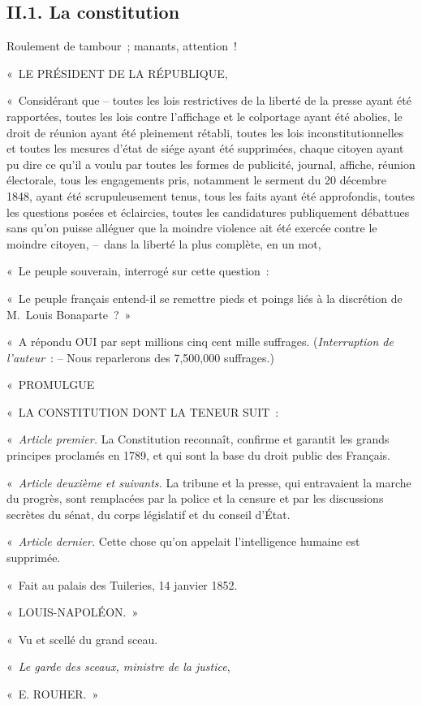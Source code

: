 \documentclass[french,twoside]{book} %
\newenvironment{quoteblock}%
  {\begin{quoting}}
  {\end{quoting}}
\newenvironment{quotebar}{%
    \def\FrameCommand{{\color{rubric!10!}\vrule width 0.5em} \hspace{0.9em}}%
    \def\OuterFrameSep{\itemsep} %
    \MakeFramed {\advance\hsize-\width \FrameRestore}
  }%
  {%
    \endMakeFramed
  }
\renewenvironment{quoteblock}%
  {%
    \savenotes
    \setstretch{0.9}
    \normalfont
    \begin{quotebar}
  }
  {%
    \end{quotebar}
    \spewnotes
  }
\begin{document}
\subsection[{II.1. La constitution}]{II.1. La constitution}
\noindent Roulement de tambour ; manants, attention !\par

\begin{quoteblock}
 \noindent « LE PRÉSIDENT DE LA RÉPUBLIQUE,\par
 « Considérant que – toutes les lois restrictives de la liberté de la presse ayant été rapportées, toutes les lois contre l’affichage et le colportage ayant été abolies, le droit de réunion ayant été pleinement rétabli, toutes les lois inconstitutionnelles et toutes les mesures d’état de siége ayant été supprimées, chaque citoyen ayant pu dire ce qu’il a voulu par toutes les formes de publicité, journal, affiche, réunion électorale, tous les engagements pris, notamment le serment du 20 décembre 1848, ayant été scrupuleusement tenus, tous les faits ayant été approfondis, toutes les questions posées et éclaircies, toutes les candidatures publiquement débattues sans qu’on puisse alléguer que la moindre violence ait été exercée contre le moindre citoyen, – dans la liberté la plus complète, en un mot,\par
 « Le peuple souverain, interrogé sur cette question :\par
 « Le peuple français entend-il se remettre pieds et poings liés à la discrétion de M. Louis Bonaparte ? »\par
 « A répondu OUI par sept millions cinq cent mille suffrages. (\emph{Interruption de l’auteur} : – Nous reparlerons des 7,500,000 suffrages.)\par
 « PROMULGUE\par
 « LA CONSTITUTION DONT LA TENEUR SUIT :\par
 « \emph{Article premier.} La Constitution reconnaît, confirme et garantit les grands principes proclamés en 1789, et qui sont la base du droit public des Français.\par
 « \emph{Article deuxième et suivants.} La tribune et la presse, qui entravaient la marche du progrès, sont remplacées par la police et la censure et par les discussions secrètes du sénat, du corps législatif et du conseil d’État.\par
 « \emph{Article dernier.} Cette chose qu’on appelait l’intelligence humaine est supprimée.\par
 « Fait au palais des Tuileries, 14 janvier 1852.\par
 « LOUIS-NAPOLÉON. »\par
 « Vu et scellé du grand sceau.\par
 « \emph{Le garde des sceaux, ministre de la justice},\par
 « E. ROUHER. »
 \end{quoteblock}
\end{document}
